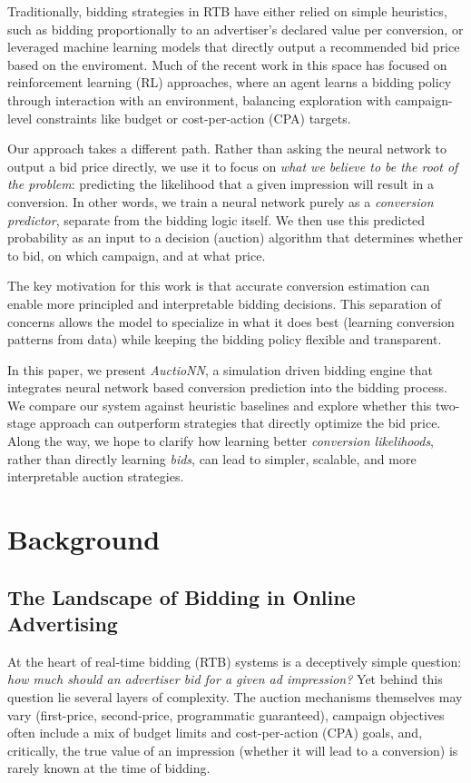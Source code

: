 \documentclass[11pt]{article}
\begin{document}
Traditionally, bidding strategies in RTB have either relied on simple heuristics, such as bidding proportionally to an advertiser's declared value per conversion, or leveraged machine learning models that directly output a recommended bid price based on the enviroment. Much of the recent work in this space has focused on reinforcement learning (RL) approaches, where an agent learns a bidding policy through interaction with an environment, balancing exploration with campaign-level constraints like budget or cost-per-action (CPA) targets.

Our approach takes a different path. Rather than asking the neural network to output a bid price directly, we use it to focus on \emph{what we believe to be the root of the problem}: predicting the likelihood that a given impression will result in a conversion. In other words, we train a neural network purely as a \emph{conversion predictor}, separate from the bidding logic itself. We then use this predicted probability as an input to a decision (auction) algorithm that determines whether to bid, on which campaign, and at what price.

The key motivation for this work is that accurate conversion estimation can enable more principled and interpretable bidding decisions. This separation of concerns allows the model to specialize in what it does best (learning conversion patterns from data) while keeping the bidding policy flexible and transparent.

In this paper, we present \emph{AuctioNN}, a simulation driven bidding engine that integrates neural network based conversion prediction into the bidding process. We compare our system against heuristic baselines and explore whether this two-stage approach can outperform strategies that directly optimize the bid price. Along the way, we hope to clarify how learning better \emph{conversion likelihoods}, rather than directly learning \emph{bids}, can lead to simpler, scalable, and more interpretable auction strategies.


\section{Background}

\subsection{The Landscape of Bidding in Online Advertising}

At the heart of real-time bidding (RTB) systems is a deceptively simple question: \emph{how much should an advertiser bid for a given ad impression?} Yet behind this question lie several layers of complexity. The auction mechanisms themselves may vary (first-price, second-price, programmatic guaranteed), campaign objectives often include a mix of budget limits and cost-per-action (CPA) goals, and, critically, the true value of an impression (whether it will lead to a conversion) is rarely known at the time of bidding.
\end{document}
